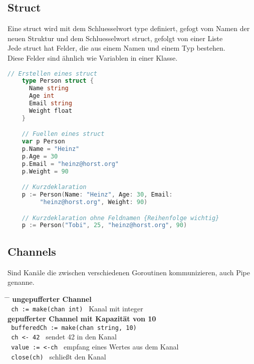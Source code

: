 \documentclass[twoside,a4paper,12pt]{article}
\begin{document}
\subsection{Struct}
Eine struct wird mit dem Schluesselwort type definiert, gefogt vom Namen der \\
neuen Struktur und dem Schluesselwort struct, gefolgt von einer Liste \\ 
Jede struct hat Felder, die aus einem Namen und einem Typ bestehen. \\ 
Diese Felder sind ähnlich wie Variablen in einer Klasse.
\begin{center}
  \begin{minipage}{1.0\textwidth}
    \begin{lstlisting}[language=go]
    // Erstellen eines struct
    type Person struct {
      Name string 
      Age int 
      Email string 
      Weight float 
    }

    // Fuellen eines struct 
    var p Person 
    p.Name = "Heinz"
    p.Age = 30 
    p.Email = "heinz@horst.org"
    p.Weight = 90

    // Kurzdeklaration 
    p := Person(Name: "Heinz", Age: 30, Email: 
         "heinz@horst.org", Weight: 90)

    // Kurzdeklaration ohne Feldnamen {Reihenfolge wichtig}
    p := Person("Tobi", 25, "heinz@horst.org", 90)
    \end{lstlisting}
  \end{minipage}
\end{center}

\subsection{Channels}
Sind Kanäle die zwischen verschiedenen Goroutinen kommunizieren, auch Pipe genanne. 
\begin{tabbing}
 \hspace{2mm} \= \hspace{50mm} \= \kill
 \> \textbf{ungepufferter Channel} \\
 \> \verb| ch := make(chan int) | \> Kanal mit integer \\ 
 \> \textbf{gepufferter Channel mit Kapazität von 10} \\
 \> \verb| bufferedCh := make(chan string, 10) | \\
 \> \verb| ch <- 42 | \> sendet 42 in den Kanal \\ 
 \> \verb| value := <-ch | \> empfang eines Wertes aus dem Kanal \\ 
 \> \verb| close(ch) | \> schließt den Kanal \\
\end{tabbing}
\end{document}
